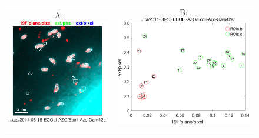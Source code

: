 \def\scf{0.42}
\begin{figure}[!ht]
\centering
\begin{tabular}{cc}
A: \includegraphics[scale=\scf, valign=t]{figs7/19F-plane-pixel-vs-ext-pixel-vs-ext-pixel-rgb}
&
B: \includegraphics[scale=\scf, valign=t]{figs7/19F-plane-pixel-vs-ext-pixel}
\\
{ } & { } \\

\end{tabular}
\end{figure}
